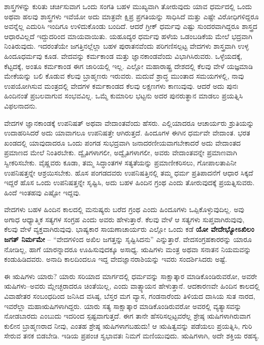 ಶಾಸ್ತ್ರಗಳನ್ನು ಕುರಿತು ಚರ್ಚಿಸುವಾಗ ಒಂದು ಸಂಗತಿ ಬಹಳ ಮುಖ್ಯವಾಗಿ ತೋರುವುದು ಯಾವ ಧರ್ಮದಲ್ಲಿ ಒಂದು ಅಥವಾ ಹಲವು ಶಾಸ್ತ್ರಗಳು ಇವೆಯೋ ಅದು ಮಾತ್ರವೇ ಕ್ಷಿಪ್ರ ಪ್ರಗತಿಯನ್ನು ಸಾಧಿಸಿದೆ ಮತ್ತು ಎಷ್ಟೇ ವಿರೋಧಿಗಳಿದ್ದರೂ ಅವನ್ನೆಲ್ಲ ಎದುರಿಸಿ ಇಂದಿಗೂ ಉಳಿದುಕೊಂಡು ಬಂದಿದೆ. ಆದರೆ ಗ್ರೀಕ್​ ಧರ್ಮವು ಎಷ್ಟು ಸುಂದರವಾಗಿದ್ದರೂ ಶಾಸ್ತ್ರದ ಆಧಾರವಿಲ್ಲದೆ ಇದ್ದುದರಿಂದ ಮಾಯವಾಯಿತು. ಯಹೂದ್ಯರ ಧರ್ಮವು ಹಳೆಯ ಒಡಂಬಡಿಕೆಯ ಮೇಲೆ ಭದ್ರವಾಗಿ ನಿಂತಿರುವುದು. ಇದರಂತೆಯೇ ಜಗತ್ತಿನಲ್ಲೆಲ್ಲಾ ಬಹಳ ಪುರಾತನವೆಂದು ಪರಿಗಣಿಸಲ್ಪಟ್ಟ ವೇದಗಳು ಶಾಸ್ತ್ರವಾಗಿ ಉಳ್ಳ ಹಿಂದೂಧರ್ಮವು ಕೂಡ. ವೇದವನ್ನು ಕರ್ಮಕಾಂಡ ಮತ್ತು ಜ್ಞಾನಕಾಂಡವೆಂದು ವಿಭಾಗಿಸಿರುವರು. ಒಳ್ಳೆಯದಕ್ಕೆ, ಕೆಟ್ಟದಕ್ಕೆ, ಅಂತೂ ಕರ್ಮಕಾಂಡ ಈಗ ಜಾರಿಯಲ್ಲಿ ಇಲ್ಲ. ಎಲ್ಲೋ ಮಹಾರಾಷ್ಟ್ರ ದೇಶದಲ್ಲಿ ಕೆಲವು ವೇಳೆ ಯಜ್ಞಮಾಡಿ ಮೇಕೆಯನ್ನು ಬಲಿ ಕೊಡುವ ಕೆಲವು ಬ್ರಾಹ್ಮಣರು ಇರುವರು. ಮದುವೆ ಶ್ರಾದ್ಧ ಮುಂತಾದ ಸಮಯಗಳಲ್ಲಿ, ನಾವು ಉಪಯೋಗಿಸುವ ಮಂತ್ರದಲ್ಲಿ ವೇದಗಳ ಕರ್ಮಕಾಂಡದ ಕೆಲವು ಲಕ್ಷಣಗಳು ಕಾಣುವುವು. ಆದರೆ ಅದು ಪುನಃ ಹಿಂದಿನಂತೆ ಪ್ರಬಲವಾಗುವ ಸಂಭವವಿಲ್ಲ. ಒಮ್ಮೆ ಕುಮಾರಿಲ ಭಟ್ಟನು ಅದರ ಪುನರುತ್ಥಾನ ಮಾಡಲು ಪ್ರಯತ್ನಿಸಿ ವಿಫಲನಾದನು.

\vskip 4pt

ವೇದಗಳ ಜ್ಞಾನಕಾಂಡಕ್ಕೆ ಉಪನಿಷತ್​ ಅಥವಾ ವೇದಾಂತವೆಂದು ಹೆಸರು. ಎಲ್ಲಿಯಾದರೂ ಆಚಾರ್ಯರು ಶ್ರುತಿಯನ್ನು ಉದಾಹರಿಸಿದರೆ ಅದು ಯಾವಾಗಲೂ ಉಪ\break ನಿಷತ್ತೇ ಆಗಿರುತ್ತದೆ. ಹಿಂದೂಗಳ ಈಗಿನ ಧರ್ಮವೇ ವೇದಾಂತ. ಭರತ ಖಂಡದಲ್ಲಿ ಯಾವುದಾದರೂ ಒಂದು ಪಂಗಡ ಸುಭದ್ರವಾಗಿ ಜನಾದರಣೀಯವಾಗಬೇಕಾದರೆ ಅದು ವೇದಾಂತದ ಪ್ರಮಾಣದ ಮೇಲೆ ನಿಂತಿರಬೇಕು. ದ್ವೈತಿಗಳಾಗಲೀ, ಅದ್ವೈತಿಗಳಾಗಲೀ, ಅವರು ವೇದಾಂತವನ್ನೇ ಪ್ರಮಾಣವಾಗಿ ಸ್ವೀಕರಿಸಬೇಕು. ವೈಷ್ಣವರು ಕೂಡಾ, ತಮ್ಮ ಸಿದ್ಧಾಂತಗಳ ಸತ್ಯತೆಯನ್ನು ಪ್ರಮಾಣೀಕರಿಸಲು, ಗೋಪಾಲತಾಪಿನೀ ಉಪನಿಷತ್ತನ್ನೇ ಆಶ್ರಯಿಸಬೇಕು. ಹೊಸ ಪಂಗಡದವರು ಉಪನಿಷತ್ತಿನಲ್ಲಿ ತಮ್ಮ ಧರ್ಮ ಪ್ರತಿಪಾದನೆಗೆ ಆಧಾರ ಸಿಕ್ಕದೆ ಇದ್ದರೆ ಹೊಸ ಒಂದು ಉಪನಿಷತ್ತನ್ನೇ ಸೃಷ್ಟಿಸಿ, ಅದು ಬಹಳ ಹಿಂದಿನ ಗ್ರಂಥ ಎಂದು ತೋರುವುದಕ್ಕೆ ಪ್ರಯತ್ನಿಸುವರು. ಹಿಂದೆ ಇಂತಹವು ಎಷ್ಟೋ ಇದ್ದವು.

\vskip 4pt

ವೇದಗಳು ಬಹಳ ಹಿಂದಿನ ಕಾಲದಲ್ಲಿ ಮನುಷ್ಯರು ಬರೆದ ಗ್ರಂಥ ಎಂದು ಹಿಂದೂಗಳು ಒಪ್ಪಿಕೊಳ್ಳುವುದಿಲ್ಲ. ಅವು ಅಗಾಧ ಆಧ್ಯಾತ್ಮಿಕ ಸತ್ಯಗಳ ಸಂಗ್ರಹ ಎಂದು ಅವರು ಹೇಳುತ್ತಾರೆ. ಕೆಲವು ವೇಳೆ ಆ ಸತ್ಯಗಳು ಸುಪ್ತವಾಗಿರುವುವು, ಕೆಲವು ವೇಳೆ ವ್ಯಕ್ತವಾಗಿರುವುವು. ಭಾಷ್ಯಕಾರ ಸಾಯಣಾಚಾರ್ಯರು ಎಲ್ಲೋ ಒಂದು ಕಡೆ \textbf{ಯೋ ವೇದೇಭ್ಯೋಽ\-ಖಿಲಂ ಜಗತ್​ ನಿರ್ಮಮೇ} – “ವೇದಗಳಿಂದ ಅಖಿಲ ಜಗತ್ತನ್ನು ಸೃಷ್ಟಿಸಿದನು” ಎನ್ನುತ್ತಾರೆ. ವೇದಸಂಗ್ರಹಕಾರರನ್ನು ಯಾರೂ ನೋಡಿಲ್ಲ, ಹಾಗೆ ಯಾರನ್ನಾದರೂ ಊಹಿಸುವುದಕ್ಕೂ ಅಸಾಧ್ಯ. ಋಷಿಗಳು ಮಂತ್ರ ಅಥವಾ ಸನಾತನ ನಿಯಮವನ್ನು ಕಂಡುಹಿಡಿದವರು. ಅನಾದಿ ಕಾಲದಿಂದಲೂ ಇದ್ದ ವೇದಜ್ಞಾನರಾಶಿಯನ್ನು ಇವರು ಸಂದರ್ಶಿಸಿದರು ಅಷ್ಟೆ.

\vskip 4pt

ಈ ಋಷಿಗಳು ಯಾರು? ಯಾರು ಸರಿಯಾದ ಮಾರ್ಗದಲ್ಲಿ ಧರ್ಮವನ್ನು ಸಾಕ್ಷಾತ್ಕಾರ ಮಾಡಿಕೊಂಡಿರುವರೋ, ಅವರೇ ಋಷಿಗಳು–ಅವರು ಮ್ಲೇಚ್ಛರಾದರೂ ಚಿಂತೆಯಿಲ್ಲ, ಎಂದು ವಾತ್ಸ್ಯಾಯನ ಹೇಳುತ್ತಾನೆ. ಆದಕಾರಣವೇ ಹಿಂದಿನ ಕಾಲದಲ್ಲಿ ವಿವಾಹೇತರ ಸಂಬಂಧದಿಂದ ಜನಿಸಿದ ವಸಿಷ್ಠ, ಬೆಸ್ತರ ಮಗ ವ್ಯಾಸ, ಗಂಡನಾರೆಂದು ತಿಳಿಯದ ದಾಸಿಯ ಸುತ ನಾರದ, ಇವರೆಲ್ಲಾ ಮಹಾಋಷಿಗಳಾಗಿದ್ದರು. ಯಾರು ಸತ್ಯ ಸಾಕ್ಷಾತ್ಕಾರ ಮಾಡಿಕೊಂಡಿರುವರೋ ಅವರಲ್ಲಿ ವ್ಯತ್ಯಾಸವನ್ನು ನೋಡಬಾರದು ಎಂಬುದು ಇದರಿಂದ ಸ್ಪಷ್ಟವಾಗುತ್ತದೆ. ಈಗ ತಾನೇ ಹೆಸರಿಸಲ್ಪಟ್ಟವರೆಲ್ಲ ಶ್ರೇಷ್ಠ ಋಷಿಗಳಾಗಿರುವಾಗ ಕುಲೀನ ಬ್ರಾಹ್ಮಣರಾದ ನೀವು, ಎಂತಹ ಶ್ರೇಷ್ಠ ಋಷಿಗಳಾಗಬಹುದು! ಆ ಋಷಿತ್ವವನ್ನು ಪಡೆಯಲು ಪ್ರಯತ್ನಿಸಿ, ಗುರಿ ಸೇರುವ ತನಕ ಬಿಡಬೇಡಿ. ಇಡಿಯ ಪ್ರಪಂಚ ಸ್ವಭಾವತಃ ನಿಮಗೆ ಮಣಿಯುವುದು. ಋಷಿಗಳಾಗಿ, ಅದೇ ಶಕ್ತಿಯ ರಹಸ್ಯ.

